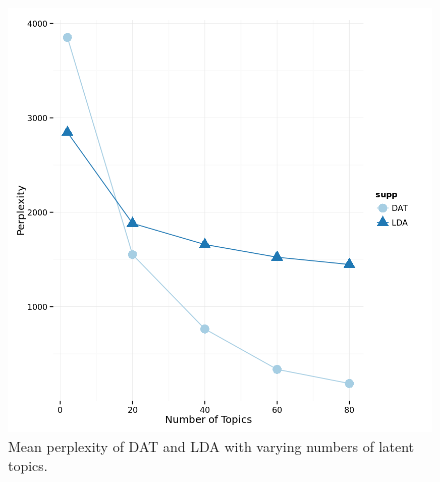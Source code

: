 \begin{figure}[h]
\centering
\includegraphics[width=1\textwidth]{figures/lda_dat_perplexity.png}
\caption{Mean perplexity of DAT and LDA with varying numbers of latent topics.}
\label{fig:lda_dat_perplexity}
\end{figure}

